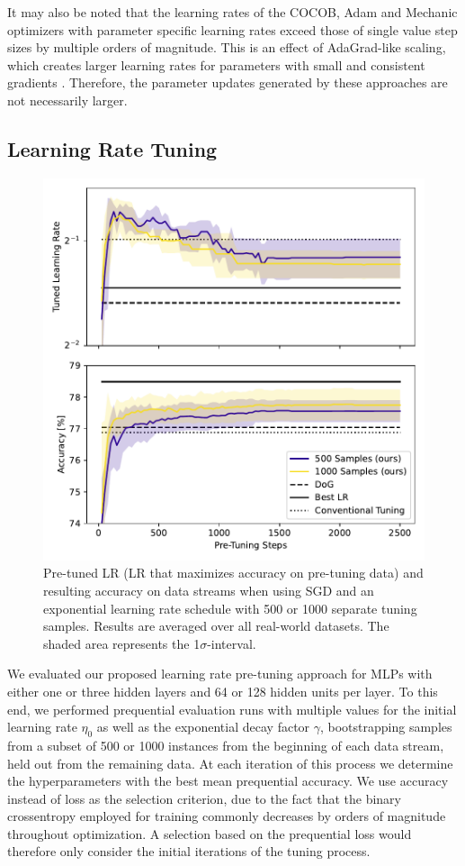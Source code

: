 \documentclass[letterpaper]{article} %
\begin{document}
It may also be noted that the learning rates of the COCOB, Adam and Mechanic optimizers with parameter specific learning rates exceed those of single value step sizes by multiple orders of magnitude.
This is an effect of AdaGrad-like scaling, which creates larger learning rates for parameters with small and consistent gradients \cite{cutkoskyMechanicLearningRate2023}.
Therefore, the parameter updates generated by these approaches are not necessarily larger.



\subsection{Learning Rate Tuning}

\begin{figure}[h]
	\centering
	\includegraphics[width=.45\textwidth]{figures/pretune_1x64_acc_lr_exp_schedule.pdf}
	\caption{Pre-tuned LR (LR that maximizes accuracy on pre-tuning data) and resulting accuracy on data streams when using SGD and an exponential learning rate schedule with 500 or 1000 separate tuning samples. Results are averaged over all real-world datasets. The shaded area represents the 1$\sigma$-interval.}\label{fig:pretune_lr_accuracy}
\end{figure}



We evaluated our proposed learning rate pre-tuning approach for MLPs with either one or three hidden layers and 64 or 128 hidden units per layer.
To this end, we performed prequential evaluation runs with multiple values for the initial learning rate $\eta_0$ as well as the exponential decay factor $\gamma$, bootstrapping samples from a subset of 500 or 1000 instances from the beginning of each data stream, held out from the remaining data.
At each iteration of this process we determine the hyperparameters with the best mean prequential accuracy.
We use accuracy instead of loss as the selection criterion, due to the fact that the binary crossentropy employed for training commonly decreases by orders of magnitude throughout optimization.
A selection based on the prequential loss would therefore only consider the initial iterations of the tuning process.
\end{document}
